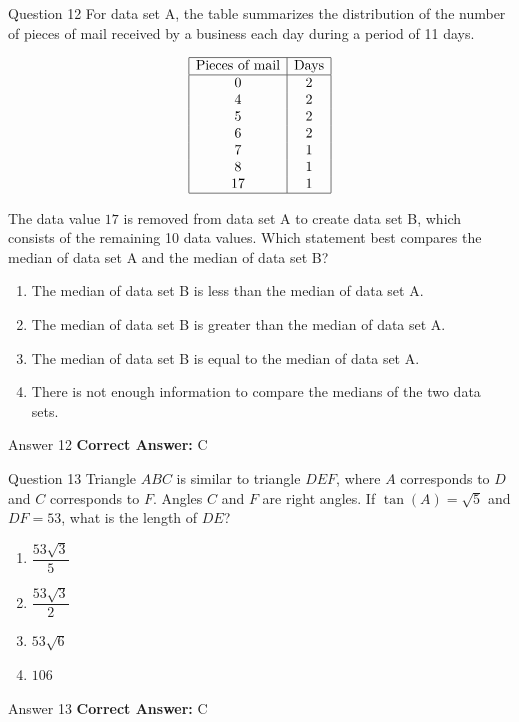 \documentclass{beamer}
\begin{document}
\begin{frame}{Question 12}
\small
For data set A, the table summarizes the distribution of the number of pieces of mail received by a business each day during a period of 11 days.

\[
\begin{array}{|c|c|}
\hline
\text{Pieces of mail} & \text{Days} \\
\hline
0 & 2 \\
4 & 2 \\
5 & 2 \\
6 & 2 \\
7 & 1 \\
8 & 1 \\
17 & 1 \\
\hline
\end{array}
\]

The data value $17$ is removed from data set A to create data set B, which consists of the remaining 10 data values.  
Which statement best compares the median of data set A and the median of data set B?
\vspace{0.35cm}
\begin{enumerate}
    \item[A.] The median of data set B is less than the median of data set A.
    \item[B.] The median of data set B is greater than the median of data set A.
    \item[C.] The median of data set B is equal to the median of data set A.
    \item[D.] There is not enough information to compare the medians of the two data sets.
\end{enumerate}
\end{frame}
\begin{frame}{Answer 12}
\small
\textbf{Correct Answer:} C
\end{frame}

\begin{frame}{Question 13}
\small
Triangle $ABC$ is similar to triangle $DEF$, where $A$ corresponds to $D$ and $C$ corresponds to $F$.  
Angles $C$ and $F$ are right angles.  
If $\tan(A) = \sqrt{5}$ and $DF = 53$, what is the length of $DE$?
\vspace{0.35cm}
\begin{enumerate}
    \item[A.] $\dfrac{53\sqrt{3}}{5}$
    \item[B.] $\dfrac{53\sqrt{3}}{2}$
    \item[C.] $53\sqrt{6}$
    \item[D.] $106$
\end{enumerate}
\end{frame}
\begin{frame}{Answer 13}
\small
\textbf{Correct Answer:} C
\end{frame}
\end{document}
